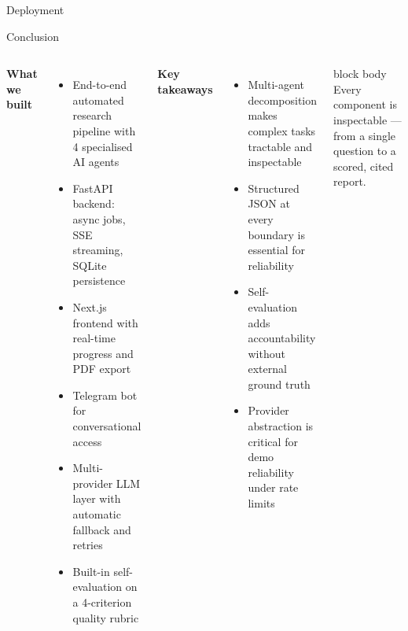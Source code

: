\documentclass[aspectratio=169, 10pt]{beamer}
\newenvironment{hlbox}{%
  \begin{beamercolorbox}[rounded=true, sep=4pt, wd=\linewidth]{block body}%
    \small}{%
  \end{beamercolorbox}}
\begin{document}
\begin{frame}[fragile]{Deployment}
  \begin{center}
  \end{center}
\end{frame}

\begin{frame}{Conclusion}
  \begin{columns}[T]
      \textbf{\color{aims-blue}What we built}
      \begin{itemize}
        \item End-to-end automated research pipeline with 4 specialised AI agents
        \item FastAPI backend: async jobs, SSE streaming, SQLite persistence
        \item Next.js frontend with real-time progress and PDF export
        \item Telegram bot for conversational access
        \item Multi-provider LLM layer with automatic fallback and retries
        \item Built-in self-evaluation on a 4-criterion quality rubric
      \end{itemize}
      \textbf{\color{aims-blue}Key takeaways}
      \begin{itemize}
        \item Multi-agent decomposition makes complex tasks tractable and inspectable
        \item Structured JSON at every boundary is essential for reliability
        \item Self-evaluation adds accountability without external ground truth
        \item Provider abstraction is critical for demo reliability under rate limits
      \end{itemize}
      \vspace{0.4em}
      \begin{hlbox}
        Every component is inspectable --- from a single question to a scored, cited report.
      \end{hlbox}
  \end{columns}
\end{frame}
\end{document}
